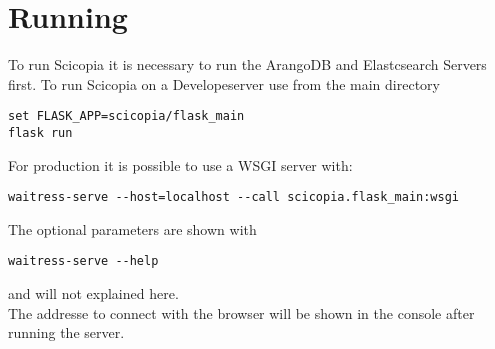 \section{Running}
To run Scicopia it is necessary to run the ArangoDB and Elastcsearch Servers first.
To run Scicopia on a Developeserver use from the main directory
\begin{verbatim}
set FLASK_APP=scicopia/flask_main
flask run
\end{verbatim}
For production it is possible to use a WSGI server with:
\begin{verbatim}
waitress-serve --host=localhost --call scicopia.flask_main:wsgi
\end{verbatim}
The optional parameters are shown with
\begin{verbatim}
waitress-serve --help
\end{verbatim}
and will not explained here.\\
The addresse to connect with the browser will be shown in the console after running the server.